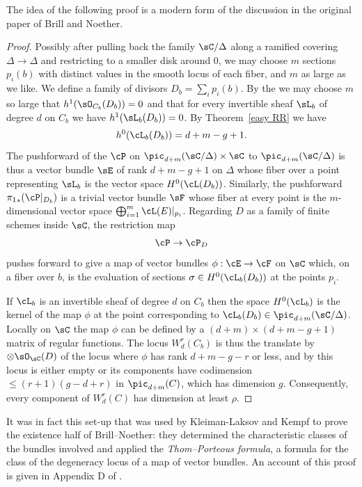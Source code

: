The idea of the following proof is a modern form of the discussion in
the original paper of Brill and Noether.

\begin{proof}  Possibly after pulling back the family $\sC/\Delta$
along a ramified covering $\Delta\to \Delta$
and restricting to a smaller disk around 0, we may choose $m$ sections
$p_{i}(b)$ with distinct values in the smooth locus of each fiber,
and $m$ as large as we like. We
define a family of divisors $D_{b} = \sum_{i}p_{i}(b)$.
By the 
%
we may choose $m$ so large
that $h^{1}(\sO_{C_{b}}(D_{b})) = 0$
and that for every invertible sheaf $\sL_{b}$ of degree $d$ on $C_{b}$
we have
$h^{1}(\sL_{b}(D_{b})) = 0$.
By Theorem~\ref{easy RR} we have
$$
h^0(\cL_{b}(D_{b})) =  d+m - g + 1.
$$
The pushforward of the 
%
$\cP$ 
on $\pic_{d+m}(\sC/\Delta)
\times \sC$ to $\pic_{d+m}(\sC/\Delta)$ is thus a vector
bundle $\sE$ of rank $d + m - g + 1$ on $\Delta$ whose fiber over a point
representing $\sL_{b}$ is the vector space $H^0(\cL(D_{b}))$. Similarly,
the pushforward
${\pi_1}_*(\cP|_{D_{b}})$
is a trivial vector bundle $\sF$ whose fiber at every point is the
$m$-dimensional vector space $\bigoplus_{i = 1}^{m} \cL(E)|_{p_i}$. Regarding
$D$ as a family of finite schemes inside $\sC$, the restriction map
$$
\cP  \to \cP_{D}
$$
pushes forward to give a map of vector bundles $\phi : \cE \to \cF$ on
$\sC$ which, on a fiber over $b$, is the evaluation of sections $\sigma
\in H^0(\cL_{b}(D_{b}))$ at the points $p_i$.

If $\cL_{b}$ is an invertible sheaf of degree $d$ on $C_{b}$ then
the space $H^0(\cL_{b})$ is the kernel of the map $\phi$ at the point
corresponding to $\cL_{b}(D_{b}) \in \pic_{d+m}(\sC/\Delta)$. Locally
on $\sC$ the map $\phi$ can be defined by a $(d+m) \times (d+m-g+1)$
matrix of regular functions. The locus $W^r_d(C_{b})$ is
thus the translate
by $\otimes \sO_{\sC}(D)$ of the locus where $\phi$ has rank $d+m-g-r$ or
less, and by \cite[Exercise 10.9]{Eisenbud1995} this locus is either empty
or its components have codimension $\leq (r+1)(g-d+r)$ in $\pic_{d+m}(C)$,
which has dimension $g$. Consequently, every component of $W^r_d(C)$
has dimension at least $\rho$.
\end{proof}

It was in fact this set-up that was used 
by Kleiman-Laksov and Kempf
to prove the existence half of
Brill--Noether: they determined the characteristic classes of the bundles
involved and applied the 
%
\emph{Thom--Porteous formula}, a formula for the
class of the degeneracy locus of a map of vector bundles. An account of
this proof is given in Appendix D of \cite{3264}.

